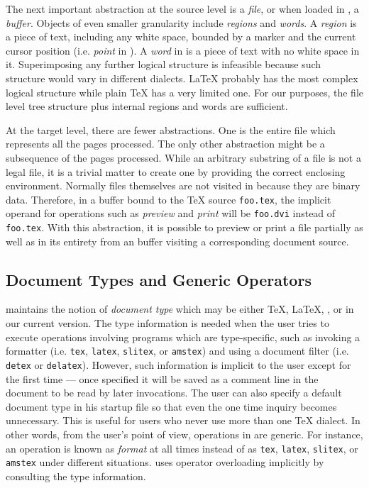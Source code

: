 The next important abstraction at the source level is a {\it file\/},
or when loaded in {\emacs}, a {\it buffer\/}.
Objects of even smaller granularity include {\it regions\/} and 
{\it words\/}.  A {\it region\/} is a piece of text, including
any white space, bounded by a marker and the current cursor position
(i.e. {\it point\/} in {\emacs}).  A {\it word\/} in {\TM} is a piece of text
with no white space in it.
Superimposing any further logical structure is infeasible because such
structure would vary in different dialects.  {\LaTeX} probably has the most
complex logical structure while plain {\TeX} has a very limited one.
For our purposes, the file level tree structure plus internal regions
and words are sufficient.

At the target level, there are fewer abstractions.
One is the entire {\dvi} file which represents all the pages processed.
The only other abstraction might be a subsequence of the pages processed.
While an arbitrary substring of a {\dvi} file is not a legal {\dvi}
file, it is a trivial matter to create one by providing the correct
enclosing environment.
Normally {\dvi} files themselves are not visited in {\emacs}
because they are binary data.
Therefore, in a buffer bound to the {\TeX} source
\verb|foo.tex|, the implicit operand for operations such as {\it preview\/}
and {\it print\/} will be \verb|foo.dvi| instead of \verb|foo.tex|.
With this abstraction, it is possible to preview or print a {\dvi} file
partially as well as in its entirety from an {\emacs} buffer visiting
a corresponding document source.

\subsection{Document Types and Generic Operators}
{\TM} maintains the notion of {\it document type\/} which may 
be either {\TeX}, {\LaTeX}, {\SliTeX}, or {\AmSTeX} in our current version.  
The type information is needed when the user tries to execute operations
involving programs which are type-specific,
such as invoking a formatter (i.e. {\tt tex}, {\tt latex}, {\tt slitex},
or {\tt amstex})
and using a document filter (i.e. {\tt detex} or {\tt delatex}).
However, such information is implicit to the user except for the first time
--- once specified it will be saved as a comment line in the document to be
read by later invocations.  The user can also specify a default document type
in his {\emacs} startup file so that even the one time inquiry becomes
unnecessary.  This is useful for users who never use more than one {\TeX}
dialect.  In other words, from the user's point of view,
operations in {\TM} are generic.  For instance,
an operation is known as {\it format\/} at all times
instead of as {\tt tex}, {\tt latex}, {\tt slitex}, or {\tt amstex}
under different situations.
{\TM} uses operator overloading implicitly by consulting the type information.


